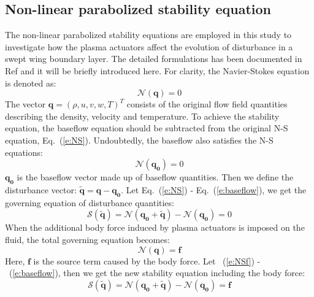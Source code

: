 \documentclass{AIAA}
\begin{document}
\subsection{Non-linear parabolized stability equation}
The non-linear parabolized stability equations are employed in this study to investigate how the plasma actuators affect the evolution of disturbance in a swept wing boundary layer. The detailed formulations has been documented in Ref \cite{wzf17} and it will be briefly introduced here. For clarity, the Navier-Stokes equation is denoted as:
\begin{equation}
    \label{e:NS}
    \mathscr{N}(\mathbf{q})=0
\end{equation}
The vector $\mathbf{q}=(\rho , u,v,w,T)^T$ consists of the original flow field quantities describing the density, velocity and temperature. To achieve the stability equation, the baseflow equation should be subtracted from the original N-S equation, Eq.~(\ref{e:NS}). Undoubtedly, the baseflow also satisfies the N-S equations:
\begin{equation}
    \label{e:baseflow}
    \mathscr{N}(\mathbf{q_0})=0
\end{equation}
$\mathbf{q_0}$ is the baseflow vector made up of baseflow quantities. Then we define the disturbance vector: $\mathbf{\tilde{q}}=\mathbf{q}-\mathbf{q_0}$. Let Eq.~(\ref{e:NS}) - Eq.~(\ref{e:baseflow}), we get the governing equation of disturbance quantities:
\begin{equation}
    \label{e:disturbance1}
    \mathscr{S}(\mathbf{\tilde{q}})=\mathscr{N}(\mathbf{q_0}+\mathbf{\tilde{q}})-\mathscr{N}(\mathbf{q_0})=0
\end{equation}
When the additional body force induced by plasma actuators is imposed on the fluid, the total governing equation becomes:
\begin{equation}
    \label{e:NSf}
    \mathscr{N}(\mathbf{q})=\mathbf{f}
\end{equation}
Here, $\mathbf{f}$ is the source term caused by the body force. Let ~(\ref{e:NSf}) -~(\ref{e:baseflow}), then we get the new stability equation including the body force:
\begin{equation}
    \label{e:disturbance2}
    \mathscr{S}(\mathbf{\tilde{q}})=\mathscr{N}(\mathbf{q_0}+\mathbf{\tilde{q}})-\mathscr{N}(\mathbf{q_0})=\mathbf{f}
\end{equation}
\end{document}
